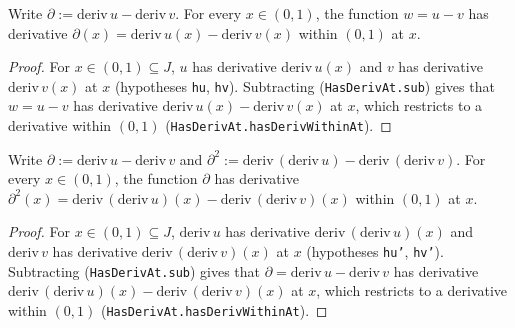 \begin{lemma}
    \label{lem:w-first-deriv}
    \leanok
    Write $\partial := \mathrm{deriv}\,u - \mathrm{deriv}\,v$. For every
    $x \in (0,1)$, the function $w = u - v$ has derivative $\partial(x) =
    \mathrm{deriv}\,u(x) - \mathrm{deriv}\,v(x)$ within $(0,1)$ at $x$.
\end{lemma}
\begin{proof}
    For $x \in (0,1) \subseteq J$, $u$ has derivative $\mathrm{deriv}\,u(x)$ and
    $v$ has derivative $\mathrm{deriv}\,v(x)$ at $x$ (hypotheses \texttt{hu},
    \texttt{hv}). Subtracting (\texttt{HasDerivAt.sub}) gives that $w = u - v$
    has derivative $\mathrm{deriv}\,u(x) - \mathrm{deriv}\,v(x)$ at $x$, which
    restricts to a derivative within $(0,1)$ (\texttt{HasDerivAt.hasDerivWithinAt}).
\end{proof}

\begin{lemma}
    \label{lem:w-second-deriv}
    \leanok
    Write $\partial := \mathrm{deriv}\,u - \mathrm{deriv}\,v$ and
    $\partial^2 := \mathrm{deriv}\,(\mathrm{deriv}\,u) -
    \mathrm{deriv}\,(\mathrm{deriv}\,v)$. For every $x \in (0,1)$, the function
    $\partial$ has derivative $\partial^2(x) =
    \mathrm{deriv}\,(\mathrm{deriv}\,u)(x) -
    \mathrm{deriv}\,(\mathrm{deriv}\,v)(x)$ within $(0,1)$ at $x$.
\end{lemma}
\begin{proof}
    For $x \in (0,1) \subseteq J$, $\mathrm{deriv}\,u$ has derivative
    $\mathrm{deriv}\,(\mathrm{deriv}\,u)(x)$ and $\mathrm{deriv}\,v$ has
    derivative $\mathrm{deriv}\,(\mathrm{deriv}\,v)(x)$ at $x$ (hypotheses
    \texttt{hu'}, \texttt{hv'}). Subtracting (\texttt{HasDerivAt.sub}) gives that
    $\partial = \mathrm{deriv}\,u - \mathrm{deriv}\,v$ has derivative
    $\mathrm{deriv}\,(\mathrm{deriv}\,u)(x) - \mathrm{deriv}\,(\mathrm{deriv}\,v)(x)$
    at $x$, which restricts to a derivative within $(0,1)$
    (\texttt{HasDerivAt.hasDerivWithinAt}).
\end{proof}

